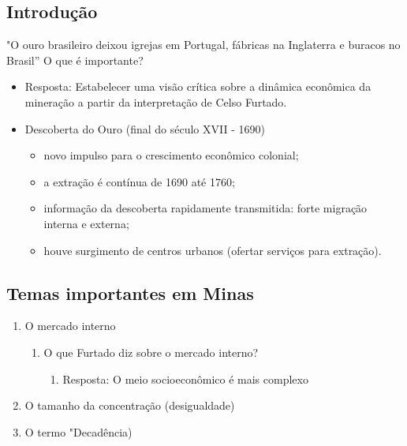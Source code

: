 \documentclass[a4paper,12pt]{article}[abntex2]
\begin{document}
\subsection{\textbf{Introdução}}
"O ouro brasileiro deixou igrejas em Portugal, fábricas na Inglaterra e buracos no Brasil”
O que é importante?
\begin{itemize}
    \item Resposta: Estabelecer uma visão crítica sobre a dinâmica econômica da mineração a partir da interpretação de Celso Furtado. 
    \item Descoberta do Ouro (final do século XVII - 1690)
    \begin{itemize}
        \item novo impulso para o crescimento econômico colonial;
        \item a extração é contínua de 1690 até 1760;
        \item informação da descoberta rapidamente transmitida: forte migração interna e externa;
        \item houve surgimento de centros urbanos (ofertar serviços para extração). 
    \end{itemize}
\end{itemize}

\subsection{\textbf{Temas importantes em Minas}}
\begin{enumerate}
    \item O mercado interno
    \begin{enumerate}
        \item O que Furtado diz sobre o mercado interno?
        \begin{enumerate}
            \item Resposta: O meio socioeconômico é mais complexo
        \end{enumerate}
    \end{enumerate}
    \item O tamanho da concentração (desigualdade)
    \item O termo "Decadência)
\end{enumerate}
\end{document}
